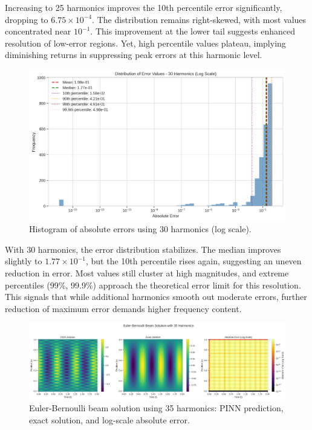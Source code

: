 \documentclass[preprint,12pt]{elsarticle}
\begin{document}
Increasing to 25 harmonics improves the 10th percentile error significantly, dropping to \(6.75 \times 10^{-4}\). The distribution remains right-skewed, with most values concentrated near \(10^{-1}\). This improvement at the lower tail suggests enhanced resolution of low-error regions. Yet, high percentile values plateau, implying diminishing returns in suppressing peak errors at this harmonic level.

\begin{figure}[t]
    \centering
    \includegraphics[width=0.9\linewidth]{figures/error_distribution_30h.png}
    \caption{Histogram of absolute errors using 30 harmonics (log scale).}
    \label{fig:error_30h}
\end{figure}

With 30 harmonics, the error distribution stabilizes. The median improves slightly to \(1.77 \times 10^{-1}\), but the 10th percentile rises again, suggesting an uneven reduction in error. Most values still cluster at high magnitudes, and extreme percentiles (99\%, 99.9\%) approach the theoretical error limit for this resolution. This signals that while additional harmonics smooth out moderate errors, further reduction of maximum error demands higher frequency content.

\begin{figure}[t]
    \centering
    \includegraphics[width=0.95\linewidth]{figures/comparison_35h.png}
    \caption{Euler-Bernoulli beam solution using 35 harmonics: PINN prediction, exact solution, and log-scale absolute error.}
    \label{fig:comparison_35h}
\end{figure}
\end{document}
